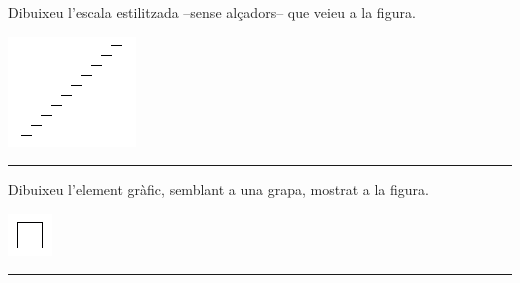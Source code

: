 \begin{center}
\colorbox{black}{}
\end{center}
{\small
\noindent
Dibuixeu l'escala estilitzada --sense alçadors-- que veieu a la figura.}
\begin{center}
\includegraphics[scale=0.78]{Imatges/figuraE7-8.png} 
\end{center}
\noindent
\rule{\textwidth}{3pt}

\begin{center}
\colorbox{black}{}
\end{center}
{\small
\noindent
Dibuixeu l'element gràfic, semblant a una grapa, mostrat a la figura.}
\begin{center}
\includegraphics[scale=1.4]{Imatges/figuraE7-9.png} 
\end{center}
\noindent
\rule{\textwidth}{3pt}

